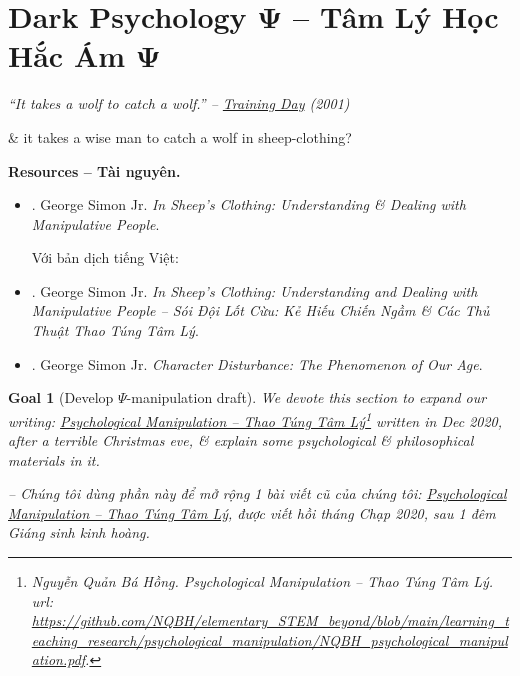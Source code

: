 \documentclass[12pt]{article}
\newtheorem{goal}{Goal}
\begin{document}

\section{Dark Psychology $\boldsymbol{\Psi}$ -- Tâm Lý Học Hắc Ám $\boldsymbol{\Psi}$}

\begin{flushright}\it
	``It takes a wolf to catch a wolf.'' -- \href{https://www.imdb.com/title/tt0139654/}{Training Day} (2001)
\end{flushright}
\& it takes a wise man to catch a wolf in sheep-clothing?

\noindent\textbf{\textsf{Resources -- Tài nguyên.}}
\begin{itemize}
	\item \cite{Simon_sheep}. {\sc George Simon Jr.} {\it In Sheep's Clothing: Understanding \& Dealing with Manipulative People}.
	
	Với bản dịch tiếng Việt:
	\item \cite{Simon_sheep_VN}. {\sc George Simon Jr.} {\it In Sheep's Clothing: Understanding and Dealing with Manipulative People -- Sói Đội Lốt Cừu: Kẻ Hiếu Chiến Ngầm \& Các Thủ Thuật Thao Túng Tâm Lý}.
	
	\item \cite{Simon_character}. {\sc George Simon Jr.} {\it Character Disturbance: The Phenomenon of Our Age}.
\end{itemize}

\begin{goal}[Develop $\Psi$-manipulation draft]
	We devote this section to expand our writing: \href{https://github.com/NQBH/elementary_STEM_beyond/blob/main/learning_teaching_research/psychological_manipulation/NQBH_psychological_manipulation.pdf}{Psychological Manipulation -- Thao Túng Tâm Lý}\footnote{{\sc Nguyễn Quản Bá Hồng}. {\it Psychological Manipulation -- Thao Túng Tâm Lý}.\\{\sc url}: \url{https://github.com/NQBH/elementary_STEM_beyond/blob/main/learning_teaching_research/psychological_manipulation/NQBH_psychological_manipulation.pdf}.} written in Dec 2020, after a terrible Christmas eve, \& explain some psychological \& philosophical materials in it.
	
	-- Chúng tôi dùng phần này để mở rộng 1 bài viết cũ của chúng tôi: \href{https://github.com/NQBH/elementary_STEM_beyond/blob/main/learning_teaching_research/psychological_manipulation/NQBH_psychological_manipulation.pdf}{Psychological Manipulation -- Thao Túng Tâm Lý}, được viết hồi tháng Chạp 2020, sau 1 đêm Giáng sinh kinh hoàng.
\end{goal}
\end{document}
